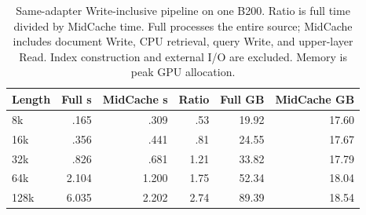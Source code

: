 \begin{table}[htbp]
\centering
\small
\setlength{\tabcolsep}{4pt}
\begin{tabular}{@{}lrrrrr@{}}
\toprule
Length & Full s & MidCache s & Ratio & Full GB & MidCache GB \\
\midrule
8k & .165 & .309 & .53 & 19.92 & 17.60 \\
16k & .356 & .441 & .81 & 24.55 & 17.67 \\
32k & .826 & .681 & 1.21 & 33.82 & 17.79 \\
64k & 2.104 & 1.200 & 1.75 & 52.34 & 18.04 \\
128k & 6.035 & 2.202 & 2.74 & 89.39 & 18.54 \\
\bottomrule
\end{tabular}
\caption{Same-adapter Write-inclusive pipeline on one B200. Ratio is full time divided by MidCache time. Full processes the entire source; MidCache includes document Write, CPU retrieval, query Write, and upper-layer Read. Index construction and external I/O are excluded. Memory is peak GPU allocation.}
\label{tab:pipeline-lengths}
\end{table}
